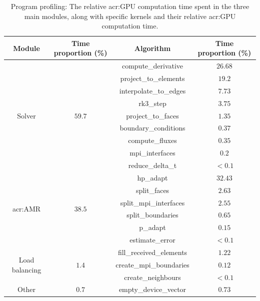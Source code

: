 \begin{table}[H]
	\centering
	\begin{tabular}{ c c c c }
		Module & Time proportion (\%) & Algorithm & Time proportion (\%) \\
		\toprule
		\multirow{9}{*}{Solver} & \multirow{9}{*}{\(59.7\)} & compute\_derivative & \(26.68\) \\
		                                                  & & project\_to\_elements & \(19.2\) \\
		                                                  & & interpolate\_to\_edges & \(7.73\) \\
		                                                  & & rk3\_step & \(3.75\) \\
		                                                  & & project\_to\_faces & \(1.35\) \\
		                                                  & & boundary\_conditions & \(0.37\) \\
		                                                  & & compute\_fluxes & \(0.35\) \\
		                                                  & & mpi\_interfaces & \(0.2\) \\
		                                                  & & reduce\_delta\_t & \(<0.1\) \\
        \midrule
        \multirow{6}{*}{\Acrshort{acr:AMR}} & \multirow{6}{*}{\(38.5\)} & hp\_adapt & \(32.43\) \\
                                                                      & & split\_faces & \(2.63\) \\
                                                                      & & split\_mpi\_interfaces & \(2.55\) \\
                                                                      & & split\_boundaries & \(0.65\) \\
                                                                      & & p\_adapt & \(0.15\) \\
                                                                      & & estimate\_error & \(<0.1\) \\
        \midrule
        \multirow{3}{*}{Load balancing} & \multirow{3}{*}{\(1.4\)} & fill\_received\_elements & \(1.22\) \\
                                                                 & & create\_mpi\_boundaries & \(0.12\) \\
                                                                 & & create\_neighbours & \(<0.1\) \\
        \midrule
        \multirow{1}{*}{Other} & \multirow{1}{*}{\(0.7\)} & empty\_device\_vector & \(0.73\) \\
	\end{tabular}
	\caption{Program profiling: The relative \acrshort{acr:GPU} computation time spent in the three main modules, along with specific kernels and their relative \acrshort{acr:GPU} computation time.}\label{table:profiling}
\end{table}

